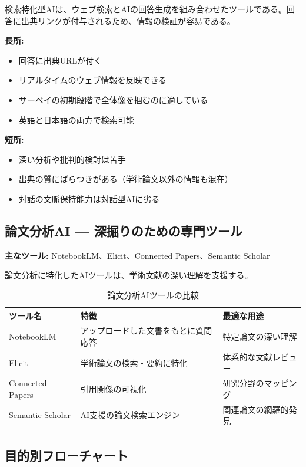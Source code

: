 検索特化型AIは、ウェブ検索とAIの回答生成を組み合わせたツールである。回答に出典リンクが付与されるため、情報の検証が容易である。

\textbf{長所:}
\begin{itemize}
\item 回答に出典URLが付く
\item リアルタイムのウェブ情報を反映できる
\item サーベイの初期段階で全体像を掴むのに適している
\item 英語と日本語の両方で検索可能
\end{itemize}

\textbf{短所:}
\begin{itemize}
\item 深い分析や批判的検討は苦手
\item 出典の質にばらつきがある（学術論文以外の情報も混在）
\item 対話の文脈保持能力は対話型AIに劣る
\end{itemize}

\subsection{論文分析AI --- 深掘りのための専門ツール}

\textbf{主なツール:} NotebookLM、Elicit、Connected Papers、Semantic Scholar

論文分析に特化したAIツールは、学術文献の深い理解を支援する。

\begin{table}[htbp]
\centering
\caption{論文分析AIツールの比較}
\label{tab:paper_analysis_tools}
\begin{tabular}{lll}
\toprule
ツール名 & 特徴 & 最適な用途 \\
\midrule
NotebookLM & アップロードした文書をもとに質問応答 & 特定論文の深い理解 \\
Elicit & 学術論文の検索・要約に特化 & 体系的な文献レビュー \\
Connected Papers & 引用関係の可視化 & 研究分野のマッピング \\
Semantic Scholar & AI支援の論文検索エンジン & 関連論文の網羅的発見 \\
\bottomrule
\end{tabular}
\end{table}

\subsection{目的別フローチャート}

